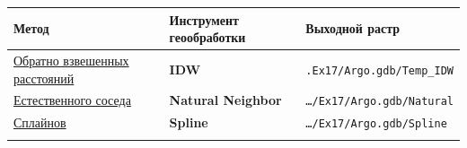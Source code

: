 \documentclass[]{book}
\theoremstyle{definition}
\theoremstyle{definition}
\theoremstyle{definition}
\theoremstyle{remark}
\begin{document}
\begin{longtable}[]{@{}lll@{}}
\toprule
\begin{minipage}[b]{0.12\columnwidth}\raggedright
Метод\strut
\end{minipage} & \begin{minipage}[b]{0.50\columnwidth}\raggedright
Инструмент геообработки\strut
\end{minipage} & \begin{minipage}[b]{0.30\columnwidth}\raggedright
Выходной растр\strut
\end{minipage}\tabularnewline
\midrule
\endhead
\begin{minipage}[t]{0.12\columnwidth}\raggedright
\href{http://desktop.arcgis.com/ru/arcmap/latest/tools/3d-analyst-toolbox/how-idw-works.htm}{Обратно
взвешенных расстояний}\strut
\end{minipage} & \begin{minipage}[t]{0.50\columnwidth}\raggedright
\textbf{IDW}\strut
\end{minipage} & \begin{minipage}[t]{0.30\columnwidth}\raggedright
\texttt{.Ex17/Argo.gdb/Temp\_IDW}\strut
\end{minipage}\tabularnewline
\begin{minipage}[t]{0.12\columnwidth}\raggedright
\href{http://desktop.arcgis.com/ru/arcmap/latest/tools/3d-analyst-toolbox/how-natural-neighbor-works.htm}{Естественного
соседа}\strut
\end{minipage} & \begin{minipage}[t]{0.50\columnwidth}\raggedright
\textbf{Natural Neighbor}\strut
\end{minipage} & \begin{minipage}[t]{0.30\columnwidth}\raggedright
\texttt{\ldots{}/Ex17/Argo.gdb/Natural}\strut
\end{minipage}\tabularnewline
\begin{minipage}[t]{0.12\columnwidth}\raggedright
\href{http://desktop.arcgis.com/ru/arcmap/latest/tools/3d-analyst-toolbox/how-spline-works.htm}{Сплайнов}\strut
\end{minipage} & \begin{minipage}[t]{0.50\columnwidth}\raggedright
\textbf{Spline}\strut
\end{minipage} & \begin{minipage}[t]{0.30\columnwidth}\raggedright
\texttt{\ldots{}/Ex17/Argo.gdb/Spline}\strut
\end{minipage}\tabularnewline
\begin{minipage}[t]{0.12\columnwidth}\raggedright

\end{minipage}
\end{longtable}
\end{document}
